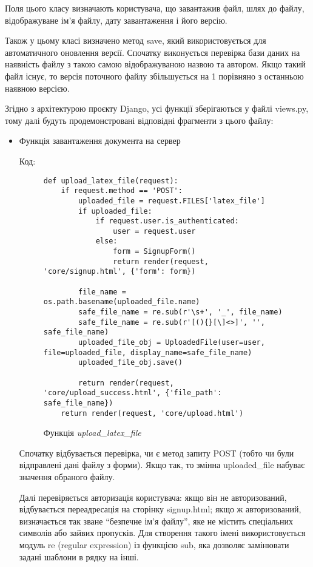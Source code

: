\documentclass[a4paper,14pt]{extarticle}
\numberwithin{figure}{section}
\begin{document}
    Поля цього класу визначають користувача, що завантажив файл, шлях до файлу, відображуване ім'я файлу, дату завантаження і його версію. 
    
    Також у цьому класі визначено метод save, який використовується для автоматичного оновлення версії. Спочатку виконується перевірка бази даних на наявність файлу з такою самою відображуваною назвою та автором. Якщо такий файл існує, то версія поточного файлу збільшується на 1 порівняно з останньою наявною версією.

    \newpage
    
    Згідно з архітектурою проєкту Django, усі функції зберігаються у файлі views.py, тому далі будуть продемонстровані відповідні фрагменти з цього файлу:

    \begin{itemize}
    \item Функція завантаження документа на сервер

    Код:
    \begin{figure}[h]
    \centering
    \begin{lstlisting}[style=mystyle]
    def upload_latex_file(request):
    if request.method == 'POST':
        uploaded_file = request.FILES['latex_file']
        if uploaded_file:
            if request.user.is_authenticated:
                user = request.user
            else:
                form = SignupForm()
                return render(request, 'core/signup.html', {'form': form})

        file_name = os.path.basename(uploaded_file.name)
        safe_file_name = re.sub(r'\s+', '_', file_name)
        safe_file_name = re.sub(r'[(){}[\]<>]', '', safe_file_name)
        uploaded_file_obj = UploadedFile(user=user, file=uploaded_file, display_name=safe_file_name)
        uploaded_file_obj.save()

        return render(request, 'core/upload_success.html', {'file_path': safe_file_name})
    return render(request, 'core/upload.html')
    \end{lstlisting}
    \caption{\normalsize Функція \textit{upload\_latex\_file}}
    \end{figure}
    

    Спочатку відбувається перевірка, чи є метод запиту POST (тобто чи були відправлені дані файлу з форми). Якщо так, то змінна uploaded\_file набуває значення обраного файлу.

    Далі перевіряється авторизація користувача: якщо він не авторизований, відбувається переадресація на сторінку signup.html; якщо ж авторизований, визначається так зване ``безпечне ім’я файлу'', яке не містить спеціальних символів або зайвих пропусків. Для створення такого імені використовується модуль re (regular expression) із функцією sub, яка дозволяє замінювати задані шаблони в рядку на інші.


\end{itemize}
\end{document}
